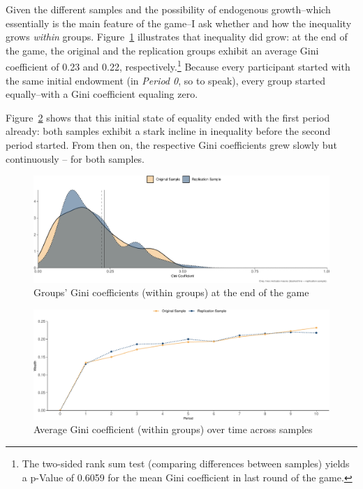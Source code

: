\documentclass[
  authoryear,
  preprint,
  3p]{elsarticle}
\begin{document}
Given the different samples and the possibility of endogenous
growth--which essentially is the main feature of the game--I ask whether
and how the inequality grows \emph{within} groups.
Figure~\ref{fig-gini-distribution} illustrates that inequality did grow:
at the end of the game, the original and the replication groups exhibit
an average Gini coefficient of 0.23 and 0.22, respectively.\footnote{The
  two-sided rank sum test (comparing differences between samples) yields
  a p-Value of 0.6059 for the mean Gini coefficient in last round of the
  game.} Because every participant started with the same initial
endowment (in \emph{Period 0}, so to speak), every group started
equally--with a Gini coefficient equaling zero.

Figure~\ref{fig-ginit-time-series} shows that this initial state of
equality ended with the first period already: both samples exhibit a
stark incline in inequality before the second period started. From then
on, the respective Gini coefficients grew slowly but continuously -- for
both samples.

\begin{figure}

{\centering \includegraphics{paper_files/figure-pdf/fig-gini-distribution-1.pdf}

}

\caption{\label{fig-gini-distribution}Groups' Gini coefficients (within
groups) at the end of the game}

\end{figure}

\begin{figure}

{\centering \includegraphics{paper_files/figure-pdf/fig-ginit-time-series-1.pdf}

}

\caption{\label{fig-ginit-time-series}Average Gini coefficient (within
groups) over time across samples}

\end{figure}
\end{document}
